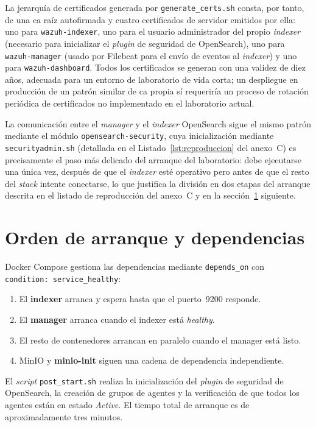 \documentclass[../main.tex]{subfiles}
\begin{document}
La jerarquía de certificados generada por \texttt{generate\_certs.sh} consta,
por tanto, de una \gls{ca} raíz autofirmada y cuatro certificados de servidor
emitidos por ella: uno para \texttt{wazuh-indexer}, uno para el usuario
administrador del propio \emph{indexer} (necesario para inicializar el
\emph{plugin} de seguridad de OpenSearch), uno para \texttt{wazuh-manager} (usado por Filebeat para el envío de eventos al \emph{indexer}) y uno
para \texttt{wazuh-dashboard}. Todos los certificados se generan con una
validez de diez años, adecuada para un entorno de laboratorio de vida corta;
un despliegue en producción de un patrón similar de \gls{ca} propia sí
requeriría un proceso de rotación periódica de certificados no implementado en
el laboratorio actual.

La comunicación entre el \emph{manager} y el \emph{indexer} OpenSearch sigue el
mismo patrón mediante el módulo \texttt{opensearch-security}, cuya
inicialización mediante \texttt{securityadmin.sh} (detallada en el
Listado~\ref{lst:reproduccion} del anexo~C) es precisamente el paso más
delicado del arranque del laboratorio: debe ejecutarse una única vez, después de
que el \emph{indexer} esté operativo pero antes de que el resto del
\emph{stack} intente conectarse, lo que justifica la división en dos etapas del
arranque descrita en el listado de reproducción del anexo~C y en la
sección~\ref{sec:orden-arranque} siguiente.

\section{Orden de arranque y dependencias}
\label{sec:orden-arranque}

Docker Compose gestiona las dependencias mediante \texttt{depends\_on} con
\texttt{condition:~\allowbreak{}service\_healthy}:

\begin{enumerate}
  \item El \textbf{indexer} arranca y espera hasta que el puerto~9200 responde.
  \item El \textbf{manager} arranca cuando el indexer está \emph{healthy}.
  \item El resto de contenedores arrancan en paralelo cuando el manager está listo.
  \item MinIO y \textbf{minio-init} siguen una cadena de dependencia independiente.
\end{enumerate}

El \emph{script} \texttt{post\_start.sh} realiza la inicialización del
\emph{plugin} de seguridad de OpenSearch, la creación de grupos de agentes y la
verificación de que todos los agentes están en estado \emph{Active}. El tiempo
total de arranque es de aproximadamente tres minutos.
\end{document}
